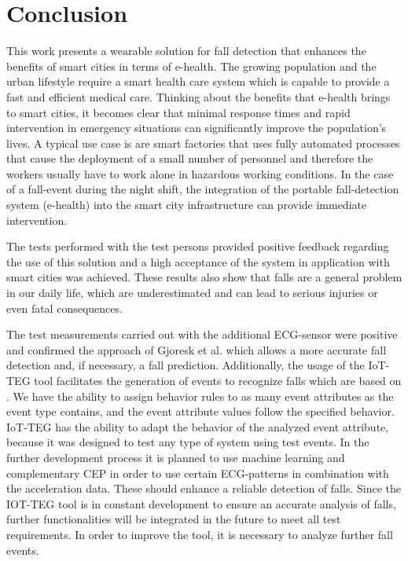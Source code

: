 \documentclass[review]{elsarticle}
\begin{document}
\section{Conclusion}
\label{sec:conclusion}
This work presents a wearable solution for fall detection that enhances the benefits of smart cities in terms of e-health. The growing population and the urban lifestyle require a smart health care system which is capable to provide a fast and efficient medical care. Thinking about the benefits that e-health brings to smart cities, it becomes clear that minimal response times and rapid intervention in emergency situations can significantly improve the population's lives. A typical use case is are smart factories that uses fully automated processes that cause the deployment of a small number of personnel and therefore the workers usually have to work alone in hazardous working conditions. In the case of a fall-event during the night shift, the integration of the portable fall-detection system (e-health) into the smart city infrastructure can provide immediate intervention. 

The tests performed with the test persons provided positive feedback regarding the use of this solution and a high acceptance of the system in application with smart cities was achieved. These results also show that falls are a general problem in our daily life, which are underestimated and can lead to serious injuries or even fatal consequences. 

The test measurements carried out with the additional ECG-sensor were positive and confirmed the approach of Gjoresk et al. \cite{Gjoreski2014} which allows a more accurate fall detection and, if necessary, a fall prediction. Additionally, the usage of the IoT-TEG tool \cite{Gutierrez2017,TesisGutierrez2017} facilitates the generation of events to recognize falls which are based on \cite{Kozina}. We have the ability to assign behavior rules to as many event attributes as the event type contains, and the event attribute values follow the specified behavior. IoT-TEG \cite{Gutierrez2017,TesisGutierrez2017} has the ability to adapt the behavior of the analyzed event attribute, because it was designed to test any type of system using test events. In the further development process it is planned to use machine learning and complementary CEP in order to use certain ECG-patterns in combination with the acceleration data. These should enhance a reliable detection of falls. Since the IOT-TEG tool \cite{Gutierrez2017,TesisGutierrez2017} is in constant development to ensure an accurate analysis of falls, further functionalities will be integrated in the future to meet all test requirements. In order to improve the tool, it is necessary to analyze further fall events.
\end{document}
